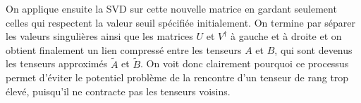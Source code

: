 On applique ensuite la SVD sur cette nouvelle matrice en gardant seulement celles qui respectent la valeur seuil spécifiée initialement.
On termine par séparer les valeurs singulières ainsi que les matrices $U$ et $V^\dagger$ à gauche et à droite et on obtient finalement un lien compressé entre les tenseurs $A$ et $B$, qui sont devenus les tenseurs approximés $\tilde{A}$ et $\tilde{B}$.
On voit donc clairement pourquoi ce processus permet d'éviter le potentiel problème de la rencontre d'un tenseur de rang trop élevé, puisqu'il ne contracte pas les tenseurs voisins.

